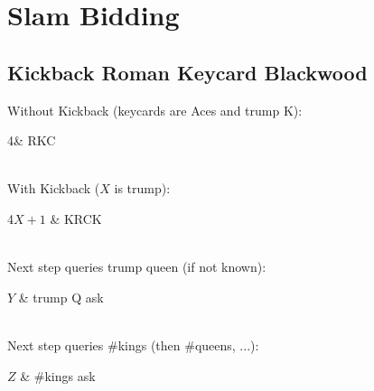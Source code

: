 \section{Slam Bidding}

\subsection{Kickback Roman Keycard Blackwood}

Without Kickback (keycards are Aces and trump K):

\begin{bidtable}
    4\N & RKC \\
    \\
\end{bidtable}

With Kickback ($X$ is trump):

\begin{bidtable}
    4$X+1$ &  KRCK \\
    \\
\end{bidtable}

Next step queries trump queen (if not known):

\begin{bidtable}
    $Y$ & trump Q ask \\
    \\
\end{bidtable}

Next step queries \#kings (then \#queens, ...):

\begin{bidtable}
    $Z$ & \#kings ask \\
    \\
\end{bidtable}

